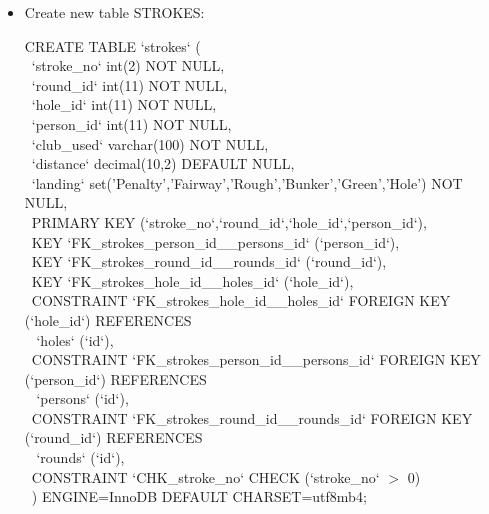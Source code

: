\documentclass[titlepage]{article}
\begin{document}
\begin{itemize}
\vspace{1em}

\item Create new table STROKES: \vspace{1em}

\hspace{15pt}CREATE TABLE `strokes` ( \\
\-\ \hspace{30pt}`stroke\_no` int(2) NOT NULL, \\
\-\ \hspace{30pt}`round\_id` int(11) NOT NULL, \\
\-\ \hspace{30pt}`hole\_id` int(11) NOT NULL, \\
\-\ \hspace{30pt}`person\_id` int(11) NOT NULL, \\
\-\ \hspace{30pt}`club\_used` varchar(100) NOT NULL, \\
\-\ \hspace{30pt}`distance` decimal(10,2) DEFAULT NULL, \\
\-\ \hspace{30pt}`landing` set('Penalty','Fairway','Rough','Bunker','Green','Hole') NOT NULL, \\
\-\ \hspace{30pt}PRIMARY KEY (`stroke\_no`,`round\_id`,`hole\_id`,`person\_id`), \\
\-\ \hspace{30pt}KEY `FK\_strokes\_person\_id\_\_persons\_id` (`person\_id`), \\
\-\ \hspace{30pt}KEY `FK\_strokes\_round\_id\_\_rounds\_id` (`round\_id`), \\
\-\ \hspace{30pt}KEY `FK\_strokes\_hole\_id\_\_holes\_id` (`hole\_id`), \\
\-\ \hspace{30pt}CONSTRAINT `FK\_strokes\_hole\_id\_\_holes\_id` FOREIGN KEY (`hole\_id`) REFERENCES \\ \-\ \hspace{30pt} `holes` (`id`), \\
\-\ \hspace{30pt}CONSTRAINT `FK\_strokes\_person\_id\_\_persons\_id` FOREIGN KEY (`person\_id`) REFERENCES \\ \-\ \hspace{30pt} `persons` (`id`), \\
\-\ \hspace{30pt}CONSTRAINT `FK\_strokes\_round\_id\_\_rounds\_id` FOREIGN KEY (`round\_id`) REFERENCES \\ \-\ \hspace{30pt} `rounds` (`id`), \\
\-\ \hspace{30pt}CONSTRAINT `CHK\_stroke\_no` CHECK (`stroke\_no` $>$ 0) \\
\-\ \hspace{15pt}) ENGINE=InnoDB DEFAULT CHARSET=utf8mb4;


\end{itemize}
\end{document}
